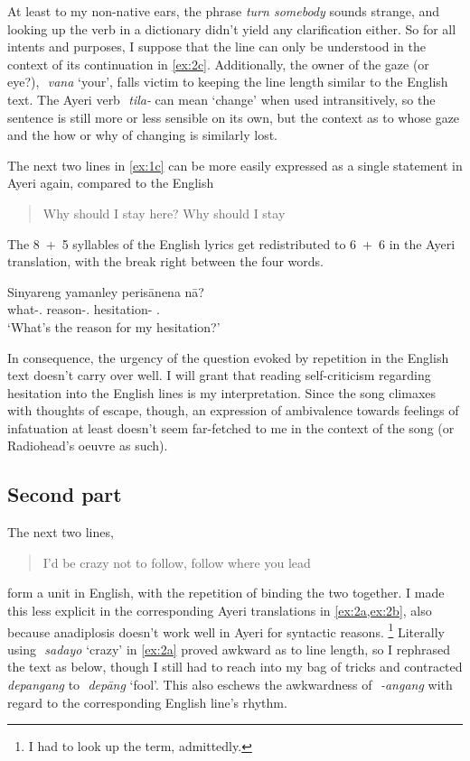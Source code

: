 \documentclass[12pt,paper=a4]{scrartcl}
\newcommand{\fw}[1]{\textit{#1}} %
\newcommand{\zwsp}{\mbox{​}} %
\newcommand{\rayr}[2]{\zwsp\smash{{\Tagati #1}} \emph{#2}} %
\newcommand{\xayr}[3]{\zwsp\smash{\Tagati #1} \emph{#2} `#3'} %
\begin{document}
At least to my non-native ears, the phrase \fw{turn somebody} sounds strange,
and looking up the verb in a dictionary didn't yield any clarification either.
So for all intents and purposes, I suppose that the line can only be understood
in the context of its continuation in \cref{ex:2c}. Additionally, the owner of
the gaze (or eye?), \xayr{vn}{vana}{your}, falls victim to keeping the line
length similar to the English text. The Ayeri verb \rayr{til/}{tila-} can mean
`change' when used intransitively, so the sentence is still more or less
sensible on its own, but the context as to whose gaze and the how or why of
changing is similarly lost.

The next two lines in \cref{ex:1c} can be more easily expressed as a single
statement in Ayeri again, compared to the English \blockquote{Why should I stay
here? Why should I stay}. The 8~+~5 syllables of the English lyrics get
redistributed to 6~+~6 in the Ayeri translation, with the break right between
the four words.

\begin{exe}
\ex \label{ex:1c}
	\gll Sinyareng yamanley perisānena nā? \\
		what-\Aarg.\Inan{} reason-\Parg.\Inan{} hesitation-\Gen{}
		\Fsg.\Gen{} \\
	\trans `What's the reason for my hesitation?'
\end{exe}

In consequence, the urgency of the question evoked by repetition in the English
text doesn't carry over well. I will grant that reading self-criticism
regarding hesitation into the English lines is my interpretation. Since the
song climaxes with thoughts of escape, though, an expression of ambivalence
towards feelings of infatuation at least doesn't seem far-fetched to me in the
context of the song (or Radiohead's oeuvre as such).

\subsection{Second part}

The next two lines, \blockquote{I'd be crazy not to follow, follow where you
lead} form a unit in English, with the repetition of  binding
the two together. I made this less explicit in the corresponding Ayeri
translations in \cref{ex:2a,ex:2b}, also because anadiplosis doesn't work well
in Ayeri for syntactic reasons.%
%
	\footnote{I had to look up the term, admittedly.}
%
Literally using \xayr{sdyo}{sadayo}{crazy} in \cref{ex:2a} proved awkward as to
line length, so I rephrased the text as below, though I still had to reach into
my bag of tricks and contracted \rayr{depNNF}{depangang} to
\xayr{depaaNF}{depāng}{fool}. This also eschews the awkwardness of
\rayr{/ANNF}{-angang} with regard to the corresponding English line's rhythm.
\end{document}
